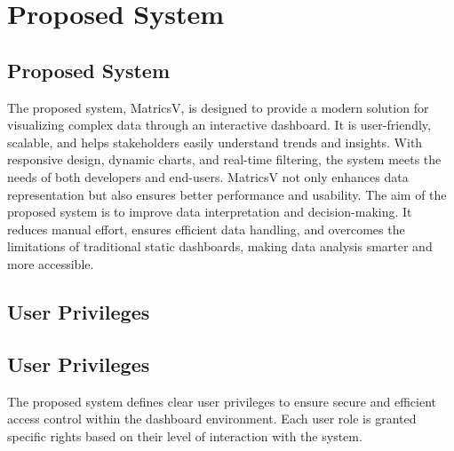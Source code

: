 \chapter{Proposed System}


\section{Proposed System}

The proposed system, MatricsV, is designed to provide a modern solution for visualizing complex data through an interactive dashboard. It is user-friendly, scalable, and helps stakeholders easily understand trends and insights. With responsive design, dynamic charts, and real-time filtering, the system meets the needs of both developers and end-users. MatricsV not only enhances data representation but also ensures better performance and usability. The aim of the proposed system is to improve data interpretation and decision-making. It reduces manual effort, ensures efficient data handling, and overcomes the limitations of traditional static dashboards, making data analysis smarter and more accessible.





\section{User Privileges}


\section*{User Privileges}

The proposed system defines clear user privileges to ensure secure and efficient access control within the dashboard environment. Each user role is granted specific rights based on their level of interaction with the system.

